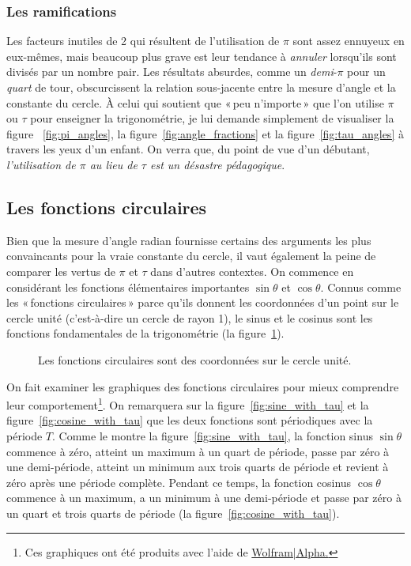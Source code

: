     \subsubsection{Les ramifications} %
    \label{sec:the_ramifications}


Les facteurs inutiles de 2 qui résultent de l'utilisation de $\pi$ sont assez ennuyeux en eux-mêmes, mais beaucoup plus grave est leur tendance à \emph{annuler} lorsqu'ils sont divisés par un nombre pair. Les résultats absurdes, comme un \emph{demi}-$\pi$ pour un \emph{quart} de tour, obscurcissent la relation sous-jacente entre la mesure d'angle et la constante du cercle. À celui qui soutient que «\,peu n'importe\,» que l'on utilise $\pi$ ou $\tau$ pour enseigner la trigonométrie, je lui demande simplement de visualiser la figure ~\ref{fig:pi_angles}, la figure~\ref{fig:angle_fractions} et la figure~\ref{fig:tau_angles} à travers les yeux d'un enfant. On verra que, du point de vue d'un débutant, \emph{l'utilisation de $\pi$ au lieu de $\tau$ est un désastre pédagogique}.

  \subsection{Les fonctions circulaires} %
  \label{sec:the_circle_functions}

Bien que la mesure d'angle radian fournisse certains des arguments les plus convaincants pour la vraie constante du cercle, il vaut également la peine de comparer les vertus de $\pi$ et $\tau$ dans d'autres contextes. On commence en considérant les fonctions élémentaires importantes $\sin\theta$ et $\cos\theta$. Connus comme les «\,fonctions circulaires\,» parce qu'ils donnent les coordonnées d'un point sur le cercle unité (c'est-à-dire un cercle de rayon 1), le sinus et le cosinus sont les fonctions fondamentales de la trigonométrie (la figure~\ref{fig:circle_functions}).

\begin{figure}
\begin{center}
\end{center}
\caption{Les fonctions circulaires sont des coordonnées sur le cercle unité.\label{fig:circle_functions}}
\end{figure}

On fait examiner les graphiques des fonctions circulaires pour mieux comprendre leur comportement\footnote{Ces graphiques ont été produits avec l'aide de \href{https://www.wolframalpha.com/}{Wolfram|Alpha.}}. On remarquera sur la figure~\ref{fig:sine_with_tau} et la figure~\ref{fig:cosine_with_tau} que les deux fonctions sont périodiques avec la période $T$. Comme le montre la figure~\ref{fig:sine_with_tau}, la fonction sinus $\sin\theta$ commence à zéro, atteint un maximum à un quart de période, passe par zéro à une demi-période, atteint un minimum aux trois quarts de période et revient à zéro après une période complète. Pendant ce temps, la fonction cosinus $\cos\theta$ commence à un maximum, a un minimum à une demi-période et passe par zéro à un quart et trois quarts de période (la figure~\ref{fig:cosine_with_tau}).

